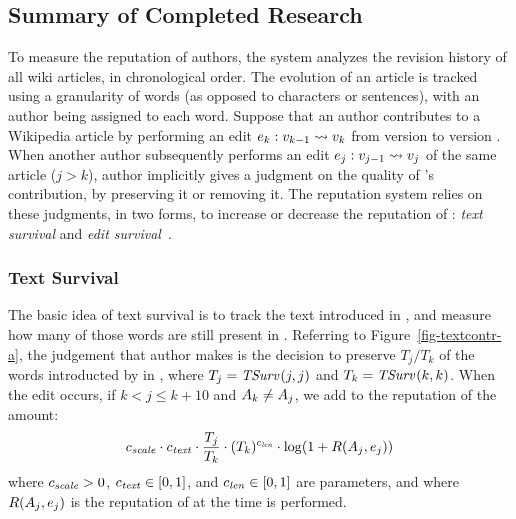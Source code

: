 \subsection{Summary of Completed Research}

To measure the reputation of authors, the system analyzes
the revision history of all wiki articles, in
chronological order.
The evolution of an article is tracked using a granularity
of words (as opposed to characters or sentences),
with an author being assigned to each word.
Suppose that an author  contributes to a Wikipedia article by
performing an edit $e_{k}: v_{k-1} \rightsquigarrow v_{k}$
from version  to
version .
When another author  subsequently performs an edit
$e_{j}: v_{j-1} \rightsquigarrow v_{j}$
of the same article ($j > k$), author 
implicitly gives a judgment on the quality of 's contribution, by
preserving it or removing it.
The reputation system relies on these judgments, in two forms, to increase
or decrease the reputation of : \textit{text survival}
and \textit{edit survival}~\cite{Adler2007}.

\subsubsection*{Text Survival}

  The basic idea of text survival is to track the text introduced in
  , and measure how many of those words are
  still present in .
  Referring to Figure~\ref{fig-textcontr-a}, the judgement
  that author  makes is the
  decision to preserve $T_j / T_k$ of the words introducted
  by  in , where
  $T_j = \mathit{TSurv}_{}(j,j)$ and $T_k = \mathit{TSurv}_{}(k,k)$.
  When the edit  occurs, if
  $k < j \leq k+10$ and $A_{k} \neq A_{j}$,
  we add to the reputation
  of  the amount:
  \[
    {c_{{\text{\textit{scale}}}}} \cdot {c_{{\text{\textit{text}}}}} \cdot \frac{T_j}{T_k}
    \cdot (T_k)^{c_{{\text{\textit{len}}}}} \cdot \log(1 + R(A_{j},e_{j}))
  \]
  where ${c_{{\text{\textit{scale}}}}} > 0$, ${c_{{\text{\textit{text}}}}} \in [0,1]$, and ${c_{{\text{\textit{len}}}}} \in
  [0,1]$ are parameters, and where $R(A_{j},e_{j})$
  is the reputation of  at the time  is performed.

